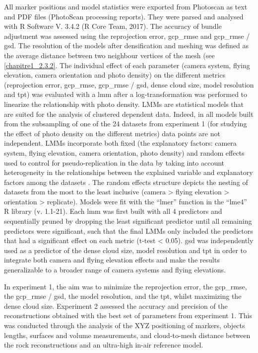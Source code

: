 All marker positions and model statistics were exported from Photoscan as text and PDF files (PhotoScan processing reports). They were parsed and analysed with R Software V. 3.4.2 (R Core Team, 2017). The accuracy of bundle adjustment was assessed using the reprojection error, \acrshort{gcp_rmse} and \acrshort{gcp_rmse} / \acrshort{gsd}. The resolution of the models after densification and meshing was defined as the average distance between two neighbour vertices of the mesh (see \ref{chapitre1_2.3.2}. The individual effect of each parameter (camera system, flying elevation, camera orientation and photo density) on the different metrics (reprojection error, \acrshort{gcp_rmse}, \acrshort{gcp_rmse} / \acrshort{gsd}, dense cloud size, model resolution and \acrshort{tpt}) was evaluated with a \gls{lmm} \citep{zuur_mixed_2009} after a log-transformation was performed to linearize the relationship with photo density. LMMs are statistical models that are suited for the analysis of clustered dependent data. Indeed, in all models built from the subsampling of one of the 24 datasets from experiment 1 (for studying the effect of photo density on the different metrics) data points are not independent. LMMs incorporate both fixed (the explanatory factors: camera system, flying elevation, camera orientation, photo density) and random effects used to control for pseudo-replication in the data by taking into account heterogeneity in the relationships between the explained variable and explanatory factors among the datasets \citep{patino_accounting_2013}. The random effects structure depicts the nesting of datasets from the most to the least inclusive (camera > flying elevation > orientation > replicate). Models were fit with the “lmer” function in the “lme4” R library (v. 1.1-21). Each \acrshort{lmm} was first built with all 4 predictors and sequentially pruned by dropping the least significant predictor until all remaining predictors were significant, such that the final LMMs only included the predictors that had a significant effect on each metric (t-test < 0.05). \acrshort{gsd} was independently used as a predictor of the dense cloud size, model resolution and \acrshort{tpt} in order to integrate both camera and flying elevation effects and make the results generalizable to a broader range of camera systems and flying elevations.
\medskip

In experiment 1, the aim was to minimize the reprojection error, the \acrshort{gcp_rmse}, the \acrshort{gcp_rmse} / \acrshort{gsd}, the model resolution, and the \acrshort{tpt}, whilst maximizing the dense cloud size. Experiment 2 assessed the accuracy and precision of the reconstructions obtained with the best set of parameters from experiment 1. This was conducted through the analysis of the XYZ positioning of markers, objects lengths, surfaces and volume measurements, and cloud-to-mesh distance between the rock reconstructions and an ultra-high in-air reference model.

